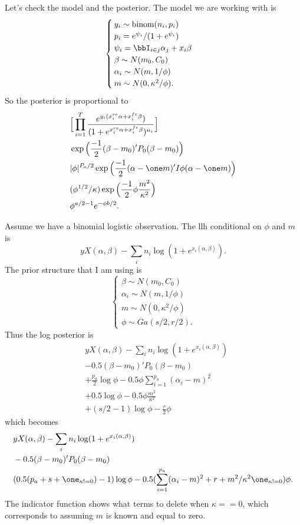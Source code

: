 \documentclass[draft]{article}
\begin{document}
Let's check the model and the posterior.  The model we are working with is
\[
\begin{cases}
y_i \sim \text{binom}(n_i, p_i) \\
p_i = e^{\psi_i} / (1 + e^{\psi_i}) \\
\psi_i = \bbI_{i \in j} \alpha_j + x_i \beta \\
\beta \sim N(m_0, C_0) \\
\alpha_i \sim N(m, 1/\phi) \\
m \sim N(0, \kappa^2 / \phi).
\end{cases}
\]
So the posterior is proportional to
\begin{align*}
& \Big[ \prod_{i=1}^T \frac{{e^{y_i (x_i^{re} \alpha + x_i^{fe} \beta})}}
  {(1+e^{x_i^{re} \alpha + x_i^{fe} \beta})^{n_i}} \Big] \\
& \exp \Big( \frac{-1}{2} (\beta-m_0)' P_0 (\beta-m_0) \Big) \\
& |\phi|^{P_a/2} \exp \Big( \frac{-1}{2} (\alpha - \one m)' I \phi (\alpha -
\one m) \Big) \\
& (\phi^{1/2} / \kappa) \exp \Big( \frac{-1}{2} \phi \frac{m^2}{\kappa^2} \Big) \\
& \phi^{a/2-1} e^{- \phi b / 2}.
\end{align*}

Assume we have a binomial logistic observation.  The llh conditional on $\phi$
and $m$ is
\[
y X (\alpha, \beta) - \sum_i n_i \log (1 + e^{x_i (\alpha, \beta)}).
\]
The prior structure that I am using is
\[
\begin{cases}
\beta \sim N(m_0, C_0) \\
\alpha_i \sim N(m, 1/\phi) \\
m \sim N(0, \kappa^2 / \phi) \\
\phi \sim Ga(s/2, r/2).
\end{cases}
\]
Thus the log posterior is
\begin{align*}
& y X (\alpha, \beta) - \sum_i n_i \log (1 + e^{x_i (\alpha, \beta)}) \\
& - 0.5 (\beta - m_0)' P_0 (\beta - m_0) \\
& + \frac{p_a}{2} \log \phi - 0.5 \phi \sum_{i=1}^{p_a} (\alpha_i - m)^2 \\
& + 0.5 \log \phi - 0.5 \phi \frac{m^2}{\kappa^2} \\
& + (s/2 - 1) \log \phi - \frac{r}{2} \phi
\end{align*}
which becomes
\begin{align*}
& y X (\alpha, \beta) - \sum_i n_i \log (1 + e^{x_i (\alpha, \beta)}) \\
& - 0.5 (\beta - m_0)' P_0 (\beta - m_0) \\
& (0.5 (p_a + s + \one_{\kappa != 0}) - 1) \log \phi - 0.5 (\sum_{i=1}^{p_a}
(\alpha_i - m)^2 + r + m^2 / \kappa^2 \one_{\kappa != 0}) \phi.
\end{align*}
The indicator function shows what terms to delete when $\kappa == 0$, which
corresponds to assuming $m$ is known and equal to zero.
\end{document}
